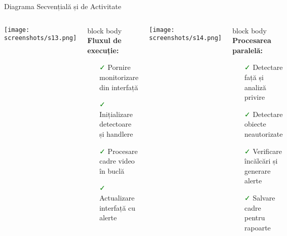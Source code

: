\documentclass[aspectratio=169,9pt]{beamer}
\begin{document}
\begin{frame}{Diagrama Secvențială și de Activitate}
        \begin{columns}[T]
                        \vspace{-0.2cm}            
                        \texttt{[image: screenshots/s13.png]}            
                        \begin{beamercolorbox}[rounded=true,shadow=true,sep=0.8em]{block body}
                                \small\textbf{Fluxul de execuție:}
                                \small
                                \begin{itemize}[leftmargin=0.5cm,itemsep=0.05cm]
                                        \item[\textcolor{green}{\faCheck}] Pornire monitorizare din interfață
                                        \item[\textcolor{green}{\faCheck}] Inițializare detectoare și handlere
                                        \item[\textcolor{green}{\faCheck}] Procesare cadre video în buclă
                                        \item[\textcolor{green}{\faCheck}] Actualizare interfață cu alerte
                                \end{itemize}
                        \end{beamercolorbox}
                        
                        \vspace{-1.2cm}
                        \begin{center}
                                \texttt{[image: screenshots/s14.png]}
                        \end{center}
                        \begin{beamercolorbox}[rounded=true,shadow=true,sep=0.8em]{block body}
                                \small\textbf{Procesarea paralelă:}                
                                \small
                                \begin{itemize}[leftmargin=0.5cm,itemsep=0.05cm]
                                        \item[\textcolor{green}{\faCheck}] Detectare față și analiză privire
                                        \item[\textcolor{green}{\faCheck}] Detectare obiecte neautorizate
                                        \item[\textcolor{green}{\faCheck}] Verificare încălcări și generare alerte
                                        \item[\textcolor{green}{\faCheck}] Salvare cadre pentru rapoarte
                                \end{itemize}
                        \end{beamercolorbox}
        \end{columns}
\end{frame}
\end{document}

